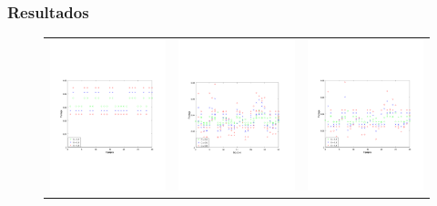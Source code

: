             \subsubsection*{Resultados}
                \begin{figure}
                    \begin{center}

                        \begin{tabular}{ccc}
                            \includegraphics{graficos/exp2-partidos-liga-afa1.pdf} & \includegraphics{graficos/exp2-partidos-liga-afa3.pdf} &
                            \includegraphics{graficos/exp2-partidos-liga-afa2.pdf}}
                        \end{tabular}
                 
\end{center}
\end{figure}
